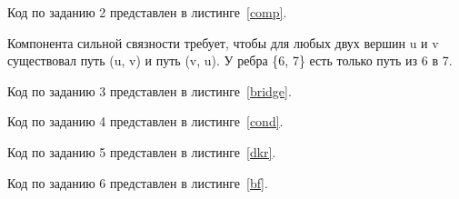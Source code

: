 
Код по заданию 2 представлен в листинге~\ref{comp}.



Компонента сильной связности требует, чтобы для любых двух вершин u и v существовал путь (u, v) и путь (v, u).
У ребра \{6, 7\} есть только путь из 6 в 7.


Код по заданию 3 представлен в листинге~\ref{bridge}.




Код по заданию 4 представлен в листинге~\ref{cond}.





Код по заданию 5 представлен в листинге~\ref{dkr}.





Код по заданию 6 представлен в листинге~\ref{bf}.




